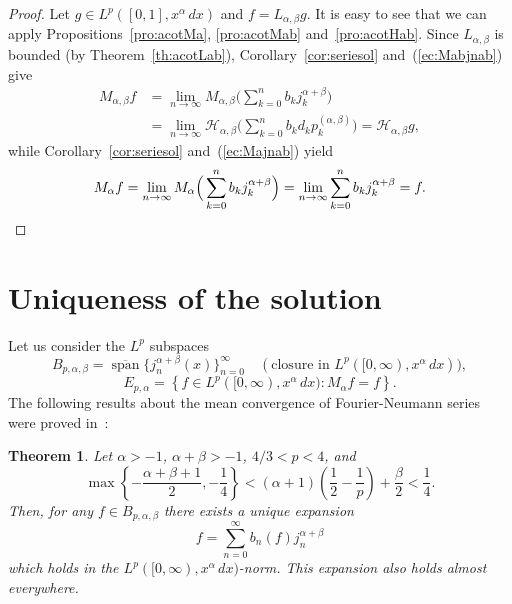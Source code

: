 \documentclass[12pt,leqno]{amsart}
\theoremstyle{plain}
\newtheorem{Thm}{Theorem}[section]
\newcommand{\spa}{\operatorname{span}} %
\newcommand{\hab}{\mathcal{H}_{\alpha,\beta}}
\newcommand{\ab}{{(\alpha,\beta)}} %
\begin{document}
\begin{proof}
Let $g \in L^p([0,1], x^\alpha \, dx)$ and $f = L_{\alpha,\beta}g$. It is
easy to see that we can apply Propositions~\ref{pro:acotMa}, \ref{pro:acotMab}
and~\ref{pro:acotHab}. Since $L_{\alpha,\beta}$ is bounded (by
Theorem~\ref{th:acotLab}), Corollary~\ref{cor:seriesol}
and~(\ref{ec:Mabjnab}) give
\begin{align*}
    M_{\alpha,\beta}f
    &= \lim_{n \to \infty} M_{\alpha,\beta}
        \Big(\sum_{k=0}^n b_kj_k^{\alpha+\beta}\Big) \\
    &= \lim_{n \to \infty} \hab
         \Big(\sum_{k=0}^n b_kd_kp_k^\ab\Big)
       = \hab g,
\end{align*}
while Corollary~\ref{cor:seriesol} and~(\ref{ec:Majnab}) yield
\begin{equation*}
    M_{\alpha}f
    = \lim_{n \to \infty}
      M_{\alpha}\Big(\sum_{k=0}^nb_kj_k^{\alpha+\beta}\Big)
    = \lim_{n \to \infty} \sum_{k=0}^n b_k j_k^{\alpha+\beta}
    = f.
   \qedhere
\end{equation*}
\end{proof}

\section{Uniqueness of the solution}
\label{sec:uniq}

Let us consider the $L^p$ subspaces
\begin{equation*}
	  B_{p,\alpha,\beta} = \overline{\spa} \{j_n^{\alpha+\beta}(x)\}_{n=0}^\infty
   \quad (\text{closure in } L^p([0,\infty),x^\alpha\,dx)),
\end{equation*}
\begin{equation*}
    E_{p,\alpha} = \left\{ f\in L^p([0,\infty),x^{\alpha}\,dx)
    : M_{\alpha}f=f \right\}.
\end{equation*}
The following results about the mean convergence of Fourier-Neumann series
were proved in~\cite{CGPV}:

\begin{Thm}
\label{th:convBp}
Let $\alpha > -1$, $\alpha+\beta > -1$, $4/3 < p < 4$, and
\begin{equation*}
    \max\left\{-\frac{\alpha+\beta+1}2, -\frac14\right\}
    < (\alpha+1) \left( \frac12 - \frac1p \right) + \frac\beta2 < \frac14.
\end{equation*}
Then, for any $f\in B_{p,\alpha,\beta}$ there exists a unique expansion
\begin{equation*}
    f = \sum_{n=0}^\infty b_n(f)j_n^{\alpha+\beta}
\end{equation*}
which holds
in the $L^p([0,\infty),x^{\alpha}\,dx)$-norm. This expansion also holds
almost everywhere.
\end{Thm}
\end{document}
